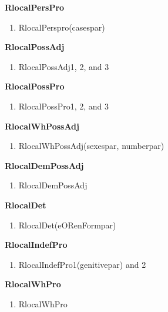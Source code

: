 \noindent
{\bf RlocalPersPro}
\begin{enumerate}
\item RlocalPerspro(casespar)
\end{enumerate}

\noindent
{\bf RlocalPossAdj}
\begin{enumerate}
\item RlocalPossAdj1, 2, and 3
\end{enumerate}

\noindent
{\bf RlocalPossPro}
\begin{enumerate}
\item RlocalPossPro1, 2, and 3
\end{enumerate}

\noindent
{\bf RlocalWhPossAdj}
\begin{enumerate}
\item RlocalWhPossAdj(sexespar, numberpar)
\end{enumerate}

\noindent
{\bf RlocalDemPossAdj}
\begin{enumerate}
\item RlocalDemPossAdj
\end{enumerate}

\noindent
{\bf RlocalDet}
\begin{enumerate}
\item RlocalDet(eORenFormpar)
\end{enumerate}

\noindent
{\bf RlocalIndefPro}
\begin{enumerate}
\item RlocalIndefPro1(genitivepar) and 2
\end{enumerate}

\noindent
{\bf RlocalWhPro}
\begin{enumerate}
\item RlocalWhPro
\end{enumerate}


